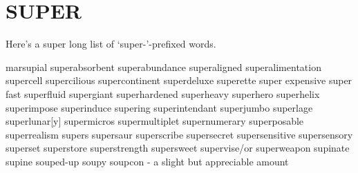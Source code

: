 \section{SUPER}
Here's a super long list of `super-'-prefixed words.

marsupial
superabsorbent
superabundance
superaligned
superalimentation
supercell
supercilious
supercontinent
superdeluxe
superette
super expensive
super fast
superfluid
supergiant
superhardened
superheavy
superhero
superhelix
superimpose
superinduce
supering
superintendant
superjumbo
superlage
superlunar[y]
supermicros
supermultiplet
supernumerary
superposable
superrealism
supers
supersaur
superscribe
supersecret
supersensitive
supersensory
superset
superstore
superstrength
supersweet
supervise/or
superweapon
supinate
supine
souped-up
soupy
soupcon - a slight but appreciable amount